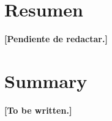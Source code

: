 \documentclass[11pt,a4paper,oneside]{report}
\renewcommand{\bibname}{Bibliografía}}
\newcommand{\pendiente}[1]{\textcolor{red!70!black}{\textbf{[#1]}}}
\begin{document}
\chapter*{Resumen}
\pendiente{Pendiente de redactar.}

\chapter*{Summary}
\begin{otherlanguage}{english}
\pendiente{To be written.}
\end{otherlanguage}

\tableofcontents
\listoftables
\listoffigures

\cleardoublepage
{}








\renewcommand{\bibname}{Bibliografía}

\end{document}
